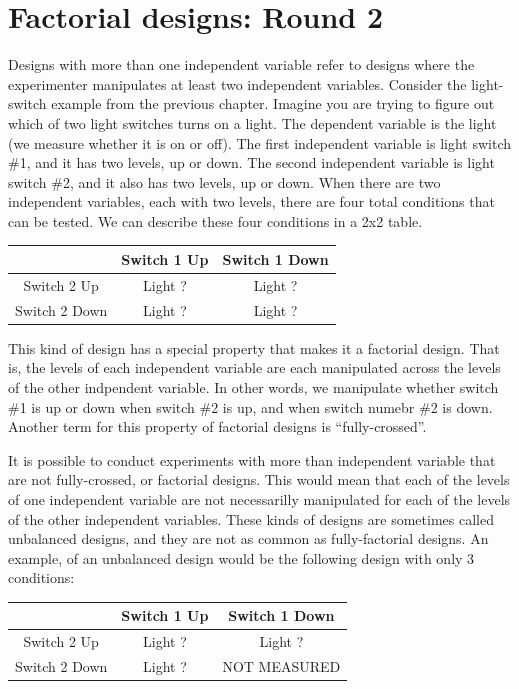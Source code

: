 \section{Factorial designs: Round 2}

Designs with more than one independent variable refer to designs where
the experimenter manipulates at least two independent variables.
Consider the light-switch example from the previous chapter. Imagine you
are trying to figure out which of two light switches turns on a light.
The dependent variable is the light (we measure whether it is on or
off). The first independent variable is light switch \#1, and it has two
levels, up or down. The second independent variable is light switch \#2,
and it also has two levels, up or down. When there are two independent
variables, each with two levels, there are four total conditions that
can be tested. We can describe these four conditions in a 2x2 table.

\begin{longtable}[]{@{}ccc@{}}
\toprule
& Switch 1 Up & Switch 1 Down\tabularnewline
\midrule
\endhead
Switch 2 Up & Light ? & Light ?\tabularnewline
Switch 2 Down & Light ? & Light ?\tabularnewline
\bottomrule
\end{longtable}

This kind of design has a special property that makes it a factorial
design. That is, the levels of each independent variable are each
manipulated across the levels of the other indpendent variable. In other
words, we manipulate whether switch \#1 is up or down when switch \#2 is
up, and when switch numebr \#2 is down. Another term for this property
of factorial designs is ``fully-crossed''.

It is possible to conduct experiments with more than independent
variable that are not fully-crossed, or factorial designs. This would
mean that each of the levels of one independent variable are not
necessarilly manipulated for each of the levels of the other independent
variables. These kinds of designs are sometimes called unbalanced
designs, and they are not as common as fully-factorial designs. An
example, of an unbalanced design would be the following design with only
3 conditions:

\begin{longtable}[]{@{}ccc@{}}
\toprule
& Switch 1 Up & Switch 1 Down\tabularnewline
\midrule
\endhead
Switch 2 Up & Light ? & Light ?\tabularnewline
Switch 2 Down & Light ? & NOT MEASURED\tabularnewline
\bottomrule
\end{longtable}

